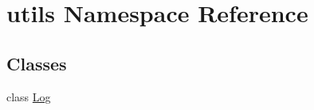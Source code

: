\hypertarget{namespaceutils}{}\section{utils Namespace Reference}
\label{namespaceutils}
\subsection*{Classes}
\begin{DoxyCompactItemize}
\item 
class \hyperlink{classutils_1_1Log}{Log}
\end{DoxyCompactItemize}
